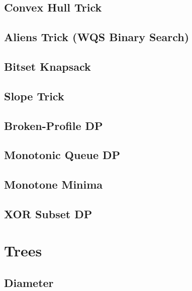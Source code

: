 \documentclass[10pt,letterpaper,landscape,twocolumn]{article}
\begin{document}
\subsection{Convex Hull Trick}


\subsection{Aliens Trick (WQS Binary Search)}

\subsection{Bitset Knapsack}

\subsection{Slope Trick}

\subsection{Broken-Profile DP}

\subsection{Monotonic Queue DP}

\subsection{Monotone Minima}

\subsection{XOR Subset DP}


\section{Trees}
\subsection{Diameter}

\end{document}

